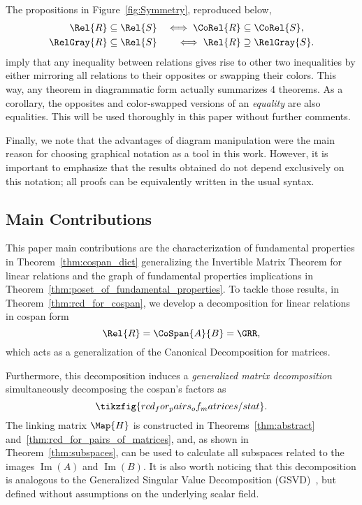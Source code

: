 \documentclass[manyauthors]{fundam}
\DeclareMathOperator{\im}{Im}
\begin{document}
The propositions in Figure~\ref{fig:Symmetry},
reproduced below,
\[
  \begin{aligned}
    \Rel{R} & \subseteq \Rel{S} &\iff \CoRel{R} &\subseteq \CoRel{S}, \\
    \RelGray{R} & \subseteq \Rel{S} &\iff \Rel{R} &\supseteq \RelGray{S}.
  \end{aligned}
\]
imply that any inequality between relations gives rise to other two inequalities
by either mirroring all relations to their opposites or swapping their colors.
This way, any theorem in diagrammatic form actually summarizes 4 theorems.
As a corollary, the opposites and color-swapped versions of an \emph{equality} are also equalities.
This will be used thoroughly in this paper without further comments.

Finally, we note that the advantages of diagram manipulation were the main reason for choosing graphical notation as a tool in this work.
However, it is important to emphasize that the results obtained do not depend exclusively on this notation;
all proofs can be equivalently written in the usual syntax.


\subsection{Main Contributions}

This paper main contributions are the characterization of fundamental properties
in Theorem~\ref{thm:cospan_dict} generalizing the Invertible Matrix Theorem for linear relations
and the graph of fundamental properties implications in Theorem~\ref{thm:poset_of_fundamental_properties}.
To tackle those results, in Theorem~\ref{thm:rcd_for_cospan},
we develop a decomposition for linear relations in cospan form
\[ \Rel{R} = \CoSpan{A}{B} = \GRR,\]
which acts as a generalization of the Canonical Decomposition for matrices.

Furthermore, this decomposition induces a \emph{generalized matrix decomposition}
simultaneously decomposing the cospan's factors as
\[\tikzfig{rcd_for_pairs_of_matrices/stat}.\]
The linking matrix $\Map{H}$ is constructed in Theorems~\ref{thm:abstract} and~\ref{thm:rcd_for_pairs_of_matrices},
and, as shown in Theorem~\ref{thm:subspaces},
can be used to calculate all subspaces related to the images $\im(A)$ and $\im(B)$.
It is also worth noticing that this decomposition is analogous to the Generalized Singular Value Decomposition (GSVD)~\cite{gsvd1976,gsvd1981},
but defined without assumptions on the underlying scalar field.
\end{document}
